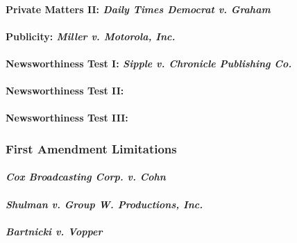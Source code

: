 
\paragraph{Private Matters II: \emph{Daily Times Democrat v. Graham}}


\paragraph{Publicity: \emph{Miller v. Motorola, Inc.}}


\paragraph{Newsworthiness Test I: \emph{Sipple v. Chronicle Publishing Co.}}


\paragraph{Newsworthiness Test II: \emph{}}


\paragraph{Newsworthiness Test III: \emph{}}


\subsubsection{First Amendment Limitations}

\paragraph{\emph{Cox Broadcasting Corp. v. Cohn}}


\paragraph{\emph{Shulman v. Group W. Productions, Inc.}}


\paragraph{\emph{Bartnicki v. Vopper}}

